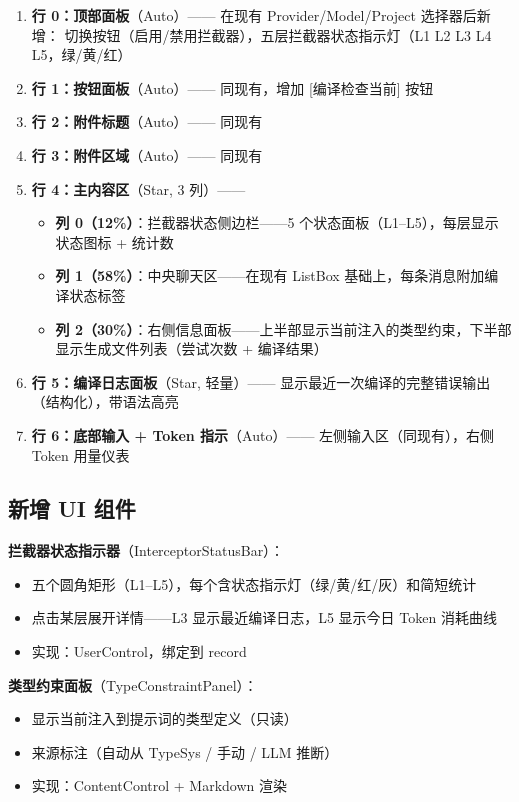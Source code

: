 \documentclass[10pt, openany]{book}
\begin{document}
\begin{enumerate}
    \item \textbf{行 0：顶部面板}（Auto）—— 在现有 Provider/Model/Project 选择器后新增：
        \cmd{[Copilot 开关]} 切换按钮（启用/禁用拦截器），五层拦截器状态指示灯（L1 L2 L3 L4 L5，绿/黄/红）
    \item \textbf{行 1：按钮面板}（Auto）—— 同现有，增加 [编译检查当前] 按钮
    \item \textbf{行 2：附件标题}（Auto）—— 同现有
    \item \textbf{行 3：附件区域}（Auto）—— 同现有
    \item \textbf{行 4：主内容区}（Star, 3 列）——
        \begin{itemize}
            \item \textbf{列 0（12\%）}：拦截器状态侧边栏——5 个状态面板（L1--L5），每层显示状态图标 + 统计数
            \item \textbf{列 1（58\%）}：中央聊天区——在现有 ListBox 基础上，每条消息附加编译状态标签
            \item \textbf{列 2（30\%）}：右侧信息面板——上半部显示当前注入的类型约束，下半部显示生成文件列表（尝试次数 + 编译结果）
        \end{itemize}
    \item \textbf{行 5：编译日志面板}（Star, 轻量）—— 显示最近一次编译的完整错误输出（结构化），带语法高亮
    \item \textbf{行 6：底部输入 + Token 指示}（Auto）—— 左侧输入区（同现有），右侧 Token 用量仪表
\end{enumerate}

\subsection{新增 UI 组件}

\noindent \textbf{拦截器状态指示器}（InterceptorStatusBar）：
\begin{itemize}
    \item 五个圆角矩形（L1--L5），每个含状态指示灯（绿/黄/红/灰）和简短统计
    \item 点击某层展开详情——L3 显示最近编译日志，L5 显示今日 Token 消耗曲线
    \item 实现：UserControl，绑定到  record
\end{itemize}

\noindent \textbf{类型约束面板}（TypeConstraintPanel）：
\begin{itemize}
    \item 显示当前注入到提示词的类型定义（只读）
    \item 来源标注（自动从 TypeSys / 手动 / LLM 推断）
    \item 实现：ContentControl + Markdown 渲染
\end{itemize}
\end{document}
